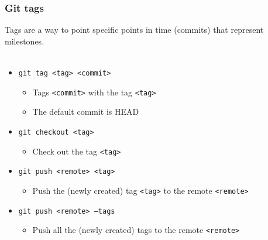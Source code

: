 \documentclass{beamer}
\begin{document}
\begin{frame}
    \frametitle{Git tags}
    Tags are a way to point specific points in time (commits) that represent milestones.\\
    \hfill \\
    \begin{itemize}
        \item \texttt{git tag <tag> <commit>}
        \begin{itemize}
            \item Tags \texttt{<commit>} with the tag \texttt{<tag>}
            \item The default commit is HEAD
        \end{itemize}
        \item \texttt{git checkout <tag>}
        \begin{itemize}
            \item Check out the tag \texttt{<tag>}
        \end{itemize}
        \item \texttt{git push <remote> <tag>}
        \begin{itemize}
            \item Push the (newly created) tag \texttt{<tag>} to the remote \texttt{<remote>}
        \end{itemize}
        \item \texttt{git push <remote> --tags}
        \begin{itemize}
            \item Push all the (newly created) tags to the remote \texttt{<remote>}
        \end{itemize}
    \end{itemize}
\end{frame}
\end{document}
